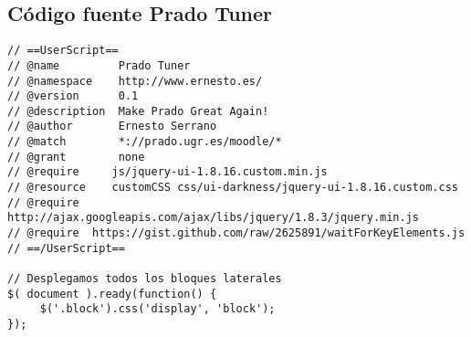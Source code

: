 \subsection{Código fuente Prado Tuner}
\begin{lstlisting}	
// ==UserScript==
// @name         Prado Tuner 
// @namespace    http://www.ernesto.es/
// @version      0.1
// @description  Make Prado Great Again!
// @author       Ernesto Serrano
// @match        *://prado.ugr.es/moodle/*
// @grant        none
// @require     js/jquery-ui-1.8.16.custom.min.js
// @resource    customCSS css/ui-darkness/jquery-ui-1.8.16.custom.css
// @require  http://ajax.googleapis.com/ajax/libs/jquery/1.8.3/jquery.min.js
// @require  https://gist.github.com/raw/2625891/waitForKeyElements.js
// ==/UserScript==

// Desplegamos todos los bloques laterales
$( document ).ready(function() {
     $('.block').css('display', 'block');
});
\end{lstlisting}

\newpage
